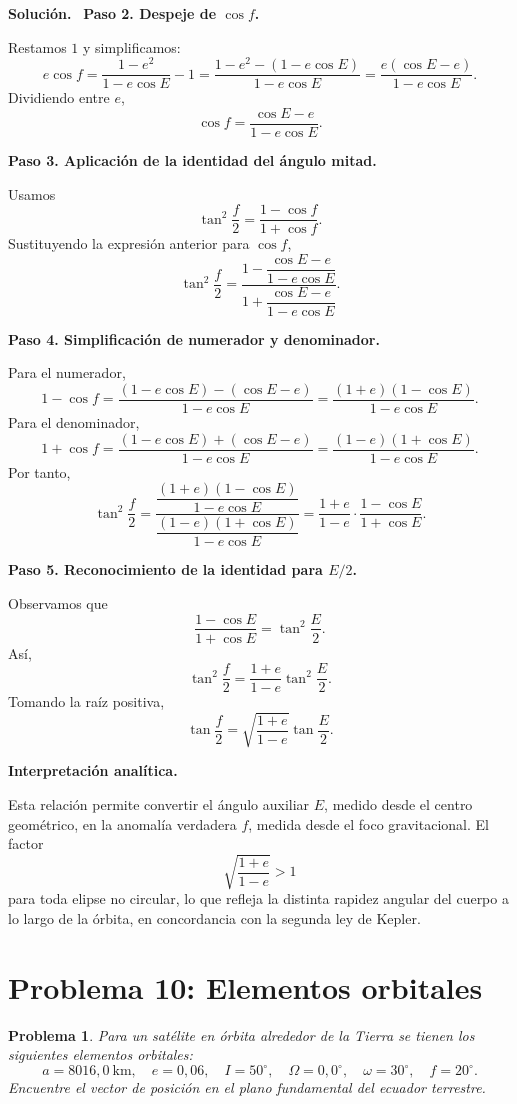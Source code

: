 \documentclass[11pt]{article}
\theoremstyle{prismstyle}
\newtheorem{problem}{Problema}
\newenvironment{solution}[1][Solución]
  {\par\textbf{#1.}\ }
  {\par}
\newcommand{\problemsection}[2]{
  \section{#1}
  \begin{problem}
  #2
  \end{problem}
}
\begin{document}
\begin{solution}
\textbf{Paso 2. Despeje de $\cos f$.}

Restamos $1$ y simplificamos:
\[
e\cos f = \frac{1-e^2}{1-e\cos E} - 1
= \frac{1-e^2-(1-e\cos E)}{1-e\cos E}
= \frac{e(\cos E-e)}{1-e\cos E}.
\]
Dividiendo entre $e$,
\[
\cos f = \frac{\cos E-e}{1-e\cos E}.
\]

\textbf{Paso 3. Aplicación de la identidad del ángulo mitad.}

Usamos
\[
\tan^2\frac{f}{2} = \frac{1-\cos f}{1+\cos f}.
\]
Sustituyendo la expresión anterior para $\cos f$,
\[
\tan^2\frac{f}{2} = \frac{1-\dfrac{\cos E-e}{1-e\cos E}}{1+\dfrac{\cos E-e}{1-e\cos E}}.
\]

\textbf{Paso 4. Simplificación de numerador y denominador.}

Para el numerador,
\[
1-\cos f = \frac{(1-e\cos E) - (\cos E-e)}{1-e\cos E}
= \frac{(1+e)(1-\cos E)}{1-e\cos E}.
\]
Para el denominador,
\[
1+\cos f = \frac{(1-e\cos E) + (\cos E-e)}{1-e\cos E}
= \frac{(1-e)(1+\cos E)}{1-e\cos E}.
\]
Por tanto,
\[
\tan^2\frac{f}{2}
= \frac{\dfrac{(1+e)(1-\cos E)}{1-e\cos E}}{\dfrac{(1-e)(1+\cos E)}{1-e\cos E}}
= \frac{1+e}{1-e}\cdot\frac{1-\cos E}{1+\cos E}.
\]

\textbf{Paso 5. Reconocimiento de la identidad para $E/2$.}

Observamos que
\[
\frac{1-\cos E}{1+\cos E} = \tan^2\frac{E}{2}.
\]
Así,
\[
\tan^2\frac{f}{2} = \frac{1+e}{1-e}\tan^2\frac{E}{2}.
\]
Tomando la raíz positiva,
\[
\boxed{\tan\frac{f}{2} = \sqrt{\frac{1+e}{1-e}}\tan\frac{E}{2}}.
\]

\textbf{Interpretación analítica.}

Esta relación permite convertir el ángulo auxiliar $E$, medido desde el centro geométrico, en la anomalía verdadera $f$, medida desde el foco gravitacional. El factor
\[
\sqrt{\frac{1+e}{1-e}} > 1
\]
para toda elipse no circular, lo que refleja la distinta rapidez angular del cuerpo a lo largo de la órbita, en concordancia con la segunda ley de Kepler.
\end{solution}

\problemsection{Problema 10: Elementos orbitales}{
Para un satélite en órbita alrededor de la Tierra se tienen los siguientes elementos orbitales:
\[
a=8016{,}0\ \text{km},
\quad e=0{,}06,
\quad I=50^\circ,
\quad \Omega=0{,}0^\circ,
\quad \omega=30^\circ,
\quad f=20^\circ.
\]
Encuentre el vector de posición en el plano fundamental del ecuador terrestre.
}
\end{document}
